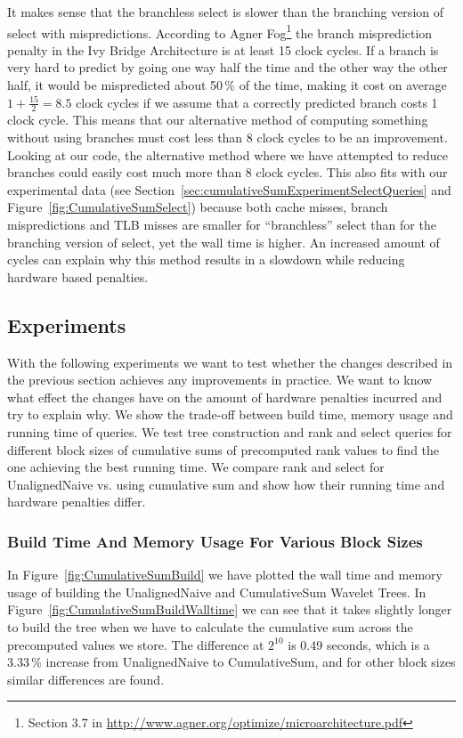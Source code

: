 It makes sense that the branchless select is slower than the branching version of select with mispredictions.
According to Agner Fog\footnote{Section 3.7 in \url{http://www.agner.org/optimize/microarchitecture.pdf}} the branch misprediction penalty in the Ivy Bridge Architecture is at least 15 clock cycles.
If a branch is very hard to predict by going one way half the time and the other way the other half, it would be mispredicted about 50\,\% of the time, making it cost on average $1+\frac{15}{2}=8.5$ clock cycles if we assume that a correctly predicted branch costs 1 clock cycle.
This means that our alternative method of computing something without using branches must cost less than 8 clock cycles to be an improvement.
Looking at our code, the alternative method where we have attempted to reduce branches could easily cost much more than 8 clock cycles.
This also fits with our experimental data (see Section~\ref{sec:cumulativeSumExperimentSelectQueries} and Figure~\ref{fig:CumulativeSumSelect}) because both cache misses, branch mispredictions and TLB misses are smaller for “branchless” select than for the branching version of select, yet the wall time is higher.
An increased amount of cycles can explain why this method results in a slowdown while reducing hardware based penalties.

\subsection{Experiments}
With the following experiments we want to test whether the changes described in the previous section achieves any improvements in practice.
We want to know what effect the changes have on the amount of hardware penalties incurred and try to explain why.
We show the trade-off between build time, memory usage and running time of queries.
We test tree construction and rank and select queries for different block sizes of cumulative sums of precomputed rank values to find the one achieving the best running time.
We compare rank and select for UnalignedNaive vs. using cumulative sum and show how their running time and hardware penalties differ.


\subsubsection{Build Time And Memory Usage For Various Block Sizes}
In Figure~\ref{fig:CumulativeSumBuild} we have plotted the wall time and memory usage of building the UnalignedNaive and CumulativeSum Wavelet Trees.
In Figure~\ref{fig:CumulativeSumBuildWalltime} we can see that it takes slightly longer to build the tree when we have to calculate the cumulative sum across the precomputed values we store.
The difference at $2^{10}$ is 0.49 seconds, which is a $3.33\,\%$ increase from UnalignedNaive to CumulativeSum, and for other block sizes similar differences are found.

